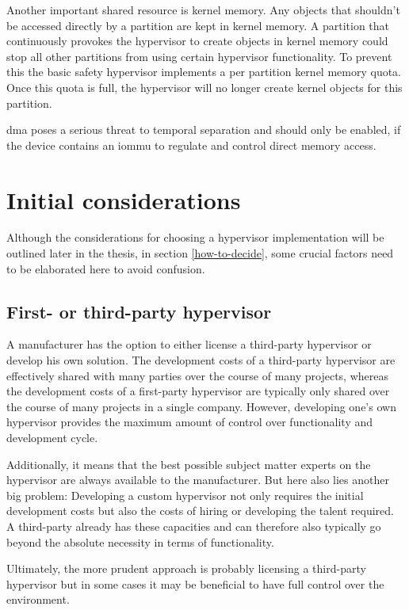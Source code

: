 Another important shared resource is kernel memory. Any objects that shouldn't be accessed directly by a partition are kept in kernel memory. A partition that continuously provokes the hypervisor to create objects in kernel memory could stop all other partitions from using certain hypervisor functionality. To prevent this the basic safety hypervisor implements a per partition kernel memory quota. Once this quota is full, the hypervisor will no longer create kernel objects for this partition.

\acrshort{dma} poses a serious threat to temporal separation and should only be enabled, if the device contains an \acrshort{iommu} to regulate and control direct memory access.

\section{Initial considerations}
Although the considerations for choosing a hypervisor implementation will be outlined later in the thesis, in section \ref{how-to-decide}, some crucial factors need to be elaborated here to avoid confusion.
\subsection{First- or third-party hypervisor}
A manufacturer has the option to either license a third-party hypervisor or develop his own solution. The development costs of a third-party hypervisor are effectively shared with many parties over the course of many projects, whereas the development costs of a first-party hypervisor are typically only shared over the course of many projects in a single company. However, developing one's own hypervisor provides the maximum amount of control over functionality and development cycle.

Additionally, it means that the best possible subject matter experts on the hypervisor are always available to the manufacturer. But here also lies another big problem: Developing a custom hypervisor not only requires the initial development costs but also the costs of hiring or developing the talent required. A third-party already has these capacities and can therefore also typically go beyond the absolute necessity in terms of functionality.

Ultimately, the more prudent approach is probably licensing a third-party hypervisor but in some cases it may be beneficial to have full control over the environment. 

